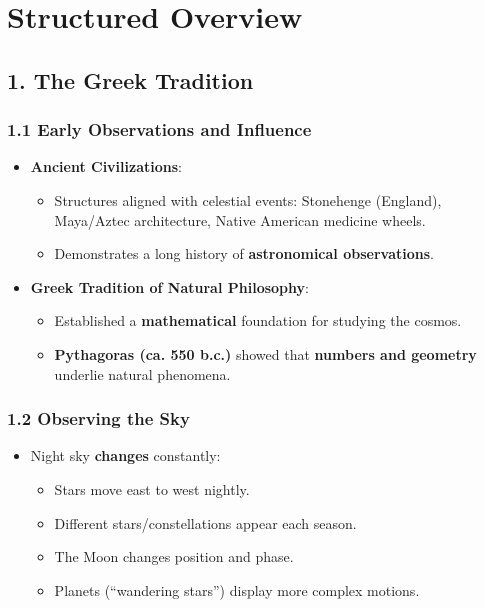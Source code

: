 \section*{Structured Overview}

\subsection*{1. The Greek Tradition}

\subsubsection*{1.1 Early Observations and Influence}
\begin{itemize}
    \item \textbf{Ancient Civilizations}:
    \begin{itemize}
        \item Structures aligned with celestial events: Stonehenge (England), Maya/Aztec architecture, Native American medicine wheels.
        \item Demonstrates a long history of \textbf{astronomical observations}.
    \end{itemize}
    \item \textbf{Greek Tradition of Natural Philosophy}:
    \begin{itemize}
        \item Established a \textbf{mathematical} foundation for studying the cosmos.
        \item \textbf{Pythagoras (ca. 550 b.c.)} showed that \textbf{numbers and geometry} underlie natural phenomena.
    \end{itemize}
\end{itemize}

\subsubsection*{1.2 Observing the Sky}
\begin{itemize}
    \item Night sky \textbf{changes} constantly:
    \begin{itemize}
        \item Stars move east to west nightly.
        \item Different stars/constellations appear each season.
        \item The Moon changes position and phase.
        \item Planets (``wandering stars'') display more complex motions.
    \end{itemize}
\end{itemize}

